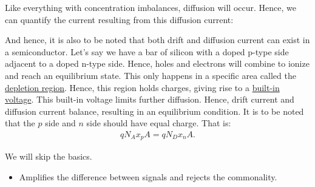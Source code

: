 \documentclass{article}
\begin{document}

    Like everything with concentration imbalances, diffusion will occur. Hence, we can
    quantify the current resulting from this diffusion current:

    \begin{multicols}{2}

    \end{multicols}
    And hence, it is also to be noted that both drift and diffusion current can exist
    in a semiconductor.
    \gap
    Let's say we have a bar of silicon with a doped p-type side adjacent to a doped n-type
    side. Hence, holes and electrons will combine to ionize and reach an equilibrium state.
    This only happens in a specific area called the \underline{depletion region}. Hence,
    this region holds charges, giving rise to a \underline{built-in voltage}. This
    built-in voltage limits further diffusion. Hence, drift current and diffusion current
    balance, resulting in an equilibrium condition.
    \gap
    It is to be noted that the $p$ side and $n$ side should have equal charge. That is:
    \begin{align*}
      q N_A x_p A = qN_D x_n A.
    \end{align*}

    We will skip the basics.
    \gap
    \begin{itemize}
    \item Amplifies the difference between signals and rejects the commonality.
    \end{itemize}

    \vfill\pagebreak

\end{document}
